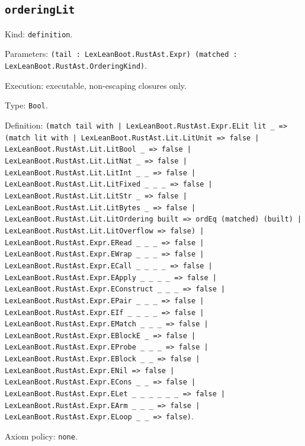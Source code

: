 \documentclass[11pt]{article}
\begin{document}
\subsection*{\texttt{orderingLit}}
\noindent Kind: \texttt{definition}.\par
\noindent Parameters: \texttt{(tail : LexLeanBoot.RustAst.Expr) (matched : LexLeanBoot.RustAst.OrderingKind)}.\par
\noindent Execution: executable, non-escaping closures only.\par
\noindent Type: \texttt{Bool}.\par
\noindent Definition: \texttt{(match tail with | LexLeanBoot.RustAst.Expr.ELit lit \_ => (match lit with | LexLeanBoot.RustAst.Lit.LitUnit => false | LexLeanBoot.RustAst.Lit.LitBool \_ => false | LexLeanBoot.RustAst.Lit.LitNat \_ => false | LexLeanBoot.RustAst.Lit.LitInt \_ \_ => false | LexLeanBoot.RustAst.Lit.LitFixed \_ \_ \_ => false | LexLeanBoot.RustAst.Lit.LitStr \_ => false | LexLeanBoot.RustAst.Lit.LitBytes \_ => false | LexLeanBoot.RustAst.Lit.LitOrdering built => ordEq (matched) (built) | LexLeanBoot.RustAst.Lit.LitOverflow => false) | LexLeanBoot.RustAst.Expr.ERead \_ \_ \_ => false | LexLeanBoot.RustAst.Expr.EWrap \_ \_ \_ => false | LexLeanBoot.RustAst.Expr.ECall \_ \_ \_ \_ => false | LexLeanBoot.RustAst.Expr.EApply \_ \_ \_ \_ => false | LexLeanBoot.RustAst.Expr.EConstruct \_ \_ \_ => false | LexLeanBoot.RustAst.Expr.EPair \_ \_ \_ => false | LexLeanBoot.RustAst.Expr.EIf \_ \_ \_ \_ => false | LexLeanBoot.RustAst.Expr.EMatch \_ \_ \_ => false | LexLeanBoot.RustAst.Expr.EBlockE \_ => false | LexLeanBoot.RustAst.Expr.EProbe \_ \_ \_ => false | LexLeanBoot.RustAst.Expr.EBlock \_ \_ => false | LexLeanBoot.RustAst.Expr.ENil => false | LexLeanBoot.RustAst.Expr.ECons \_ \_ => false | LexLeanBoot.RustAst.Expr.ELet \_ \_ \_ \_ \_ \_ => false | LexLeanBoot.RustAst.Expr.EArm \_ \_ \_ => false | LexLeanBoot.RustAst.Expr.ELoop \_ \_ => false)}.\par
\noindent Axiom policy: \texttt{none}.\par
\end{document}
